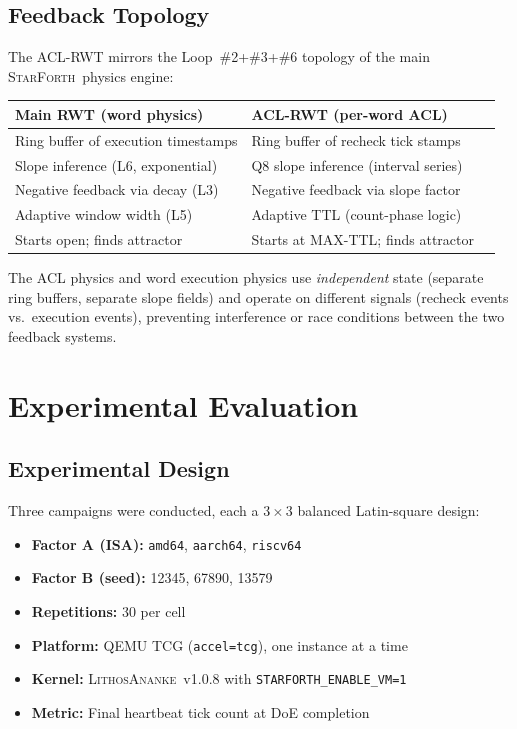 \documentclass[11pt,letterpaper,openany]{article}
\newcommand{\SF}{\textsc{StarForth}\xspace}
\newcommand{\LK}{\textsc{LithosAnanke}\xspace}
\begin{document}
\subsection{Feedback Topology}

The ACL-RWT mirrors the Loop~\#2+\#3+\#6 topology of the main \SF\
physics engine:

\begin{center}
\begin{tabular}{lll}
\toprule
\textbf{Main RWT (word physics)} & \textbf{ACL-RWT (per-word ACL)} \\
\midrule
Ring buffer of execution timestamps & Ring buffer of recheck tick stamps \\
Slope inference (L6, exponential) & Q8 slope inference (interval series) \\
Negative feedback via decay (L3) & Negative feedback via slope factor \\
Adaptive window width (L5) & Adaptive TTL (count-phase logic) \\
Starts open; finds attractor & Starts at MAX-TTL; finds attractor \\
\bottomrule
\end{tabular}
\end{center}

The ACL physics and word execution physics use \emph{independent}
state (separate ring buffers, separate slope fields) and operate on
different signals (recheck events vs.\ execution events), preventing
interference or race conditions between the two feedback systems.

\section{Experimental Evaluation}
\label{sec:results}

\subsection{Experimental Design}

Three campaigns were conducted, each a $3\times3$ balanced
Latin-square design:

\begin{itemize}
  \item \textbf{Factor A (ISA):} \texttt{amd64}, \texttt{aarch64}, \texttt{riscv64}
  \item \textbf{Factor B (seed):} 12345, 67890, 13579
  \item \textbf{Repetitions:} 30 per cell
  \item \textbf{Platform:} QEMU TCG (\texttt{accel=tcg}), one instance at a time
  \item \textbf{Kernel:} \LK\ v1.0.8 with \texttt{STARFORTH\_ENABLE\_VM=1}
  \item \textbf{Metric:} Final heartbeat tick count at DoE completion
\end{itemize}
\end{document}
